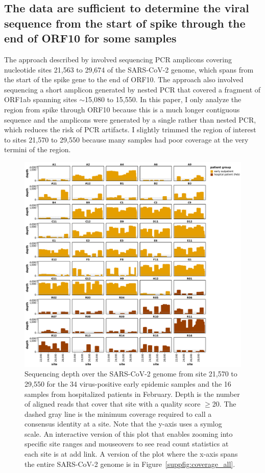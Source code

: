 \documentclass[9pt,twocolumn,twoside]{gsajnl_modified}
\begin{document}
\subsection{The data are sufficient to determine the viral sequence from the start of spike through the end of ORF10 for some samples}
The approach described by \citet{wang2020medRxiv} involved sequencing PCR amplicons covering nucleotide sites 21,563 to 29,674 of the SARS-CoV-2 genome, which spans from the start of the spike gene to the end of ORF10.
The approach also involved sequencing a short amplicon generated by nested PCR that covered a fragment of ORF1ab spanning sites $\sim$15,080 to 15,550.
In this paper, I only analyze the region from spike through ORF10 because this is a much longer contiguous sequence and the amplicons were generated by a single rather than nested PCR, which reduces the risk of PCR artifacts.
I slightly trimmed the region of interest to sites 21,570 to 29,550 because many samples had poor coverage at the very termini of the region.

\begin{figure}[]
\centering
\includegraphics[width=\linewidth]{figures/coverage_region.pdf}
\caption{Sequencing depth over the SARS-CoV-2 genome from site 21,570 to 29,550 for the 34 virus-positive early epidemic samples and the 16 samples from hospitalized patients in February.
Depth is the number of aligned reads that cover that site with a quality score $\ge$20.
The dashed gray line is the minimum coverage required to call a consensus identity at a site.
Note that the y-axis uses a symlog scale.
An interactive version of this plot that enables zooming into specific site ranges and mouseovers to see read count statistics at each site is at {\color{red} add link}.
A version of the plot where the x-axis spans the entire SARS-CoV-2 genome is in Figure~\ref{suppfig:coverage_all}.
}
\label{fig:coverage}
\end{figure}
\end{document}
